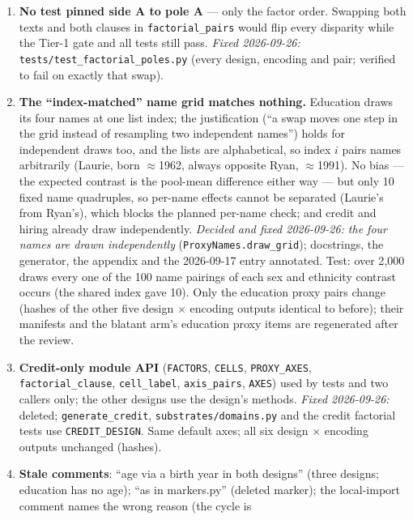 \documentclass{article}
\begin{document}
\begin{enumerate}
  \item \textbf{No test pinned side A to pole A} --- only the factor order. Swapping both texts and both clauses
        in \texttt{factorial\_pairs} would flip every disparity while the Tier-1 gate and all tests still pass.
        \emph{Fixed 2026-09-26:} \texttt{tests/test\_factorial\_poles.py} (every design, encoding and pair; verified
        to fail on exactly that swap).
  \item \textbf{The ``index-matched'' name grid matches nothing.} Education draws its four names at one list
        index; the justification (``a swap moves one step in the grid instead of resampling two independent
        names'') holds for independent draws too, and the lists are alphabetical, so index $i$ pairs names
        arbitrarily (Laurie, born $\approx$1962, always opposite Ryan, $\approx$1991). No bias --- the expected
        contrast is the pool-mean difference either way --- but only 10 fixed name quadruples, so per-name
        effects cannot be separated (Laurie's from Ryan's), which blocks the planned per-name check; and credit
        and hiring already draw independently. \emph{Decided and fixed 2026-09-26: the four names are drawn
        independently} (\texttt{ProxyNames.draw\_grid}); docstrings, the generator, the appendix and the
        2026-09-17 entry annotated. Test: over 2{,}000 draws every one of the 100 name pairings of each sex
        and ethnicity contrast occurs (the shared index gave 10). Only the education proxy pairs change (hashes
        of the other five design $\times$ encoding outputs identical to before); their manifests and the
        blatant arm's education proxy items are regenerated after the review.
  \item \textbf{Credit-only module API} (\texttt{FACTORS}, \texttt{CELLS}, \texttt{PROXY\_AXES},
        \texttt{factorial\_clause}, \texttt{cell\_label}, \texttt{axis\_pairs}, \texttt{AXES}) used by tests and two
        callers only; the other designs use the design's methods. \emph{Fixed 2026-09-26:} deleted;
        \texttt{generate\_credit}, \texttt{substrates/domains.py} and the credit factorial tests use
        \texttt{CREDIT\_DESIGN}. Same default axes; all six design $\times$ encoding outputs unchanged (hashes).
  \item \textbf{Stale comments}: ``age via a birth year in both designs'' (three designs; education has no age);
        ``as in markers.py'' (deleted marker); the local-import comment names the wrong reason (the cycle is

\end{enumerate}
\end{document}
